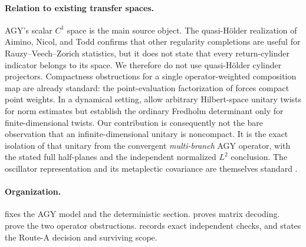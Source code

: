 \paragraph{Relation to existing transfer spaces.}
AGY's scalar \(C^1\) space is the main source object.  The quasi-H\"older
realization of Aimino, Nicol, and Todd \citep{aimino2017} confirms that other
regularity completions are useful for Rauzy--Veech--Zorich statistics, but it
does not state that every return-cylinder indicator belongs to its space.
We therefore do not use quasi-H\"older cylinder projectors.  Compactness
obstructions for a single operator-weighted composition map are already
standard: the point-evaluation factorization of
\citet{bonet2012} forces compact point weights.  In a dynamical setting,
\citet{magee-naud2020} allow arbitrary Hilbert-space unitary twists for norm
estimates but establish the ordinary Fredholm determinant only for
finite-dimensional twists.  Our contribution is consequently not the bare
observation that an infinite-dimensional unitary is noncompact.  It is the
exact isolation of that unitary from the convergent \emph{multi-branch} AGY
operator, with the stated full half-planes and the independent normalized
\(L^2\) conclusion.  The oscillator representation and its metaplectic
covariance are themselves standard \citep{folland1989}.

\paragraph{Organization.}
 fixes the AGY model and the deterministic section.
 proves matrix decoding.   prove the
two operator obstructions.   records exact independent
checks, and  states the Route-A decision and surviving scope.
